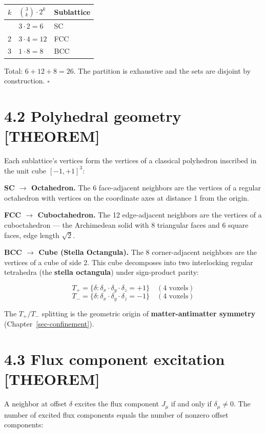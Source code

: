 \documentclass[
  11pt,
  letterpaper,
  twoside,
  openright]{book}
\begin{document}
\begin{longtable}[]{@{}lll@{}}
\toprule\noalign{}
\(k\) & \(\binom{3}{k} \cdot 2^k\) & Sublattice \\
\midrule\noalign{}
\endhead
\bottomrule\noalign{}
\endlastfoot
1 & \(3 \cdot 2 = 6\) & SC \\
2 & \(3 \cdot 4 = 12\) & FCC \\
3 & \(1 \cdot 8 = 8\) & BCC \\
\end{longtable}

Total: \(6 + 12 + 8 = 26\). The partition is exhaustive and the sets are
disjoint by construction. \(\square\)

\section{4.2 Polyhedral geometry
{[}THEOREM{]}}\label{polyhedral-geometry-theorem}

Each sublattice's vertices form the vertices of a classical polyhedron
inscribed in the unit cube \([-1, +1]^3\):

\textbf{SC \(\to\) Octahedron.} The 6 face-adjacent neighbors are the
vertices of a regular octahedron with vertices on the coordinate axes at
distance 1 from the origin.

\textbf{FCC \(\to\) Cuboctahedron.} The 12 edge-adjacent neighbors are
the vertices of a cuboctahedron --- the Archimedean solid with 8
triangular faces and 6 square faces, edge length \(\sqrt{2}\).

\textbf{BCC \(\to\) Cube (Stella Octangula).} The 8 corner-adjacent
neighbors are the vertices of a cube of side 2. This cube decomposes
into two interlocking regular tetrahedra (the \textbf{stella octangula})
under sign-product parity:

\[
T_+ = \{ \delta : \delta_x \cdot \delta_y \cdot \delta_z = +1 \} \quad (4 \text{ voxels})
\] \[
T_- = \{ \delta : \delta_x \cdot \delta_y \cdot \delta_z = -1 \} \quad (4 \text{ voxels})
\]

The \(T_+/T_-\) splitting is the geometric origin of
\textbf{matter-antimatter symmetry} (Chapter~\ref{sec-confinement}).

\section{4.3 Flux component excitation
{[}THEOREM{]}}\label{flux-component-excitation-theorem}

A neighbor at offset \(\delta\) excites the flux component \(J_\mu\) if
and only if \(\delta_\mu \neq 0\). The number of excited flux components
equals the number of nonzero offset components:
\end{document}

